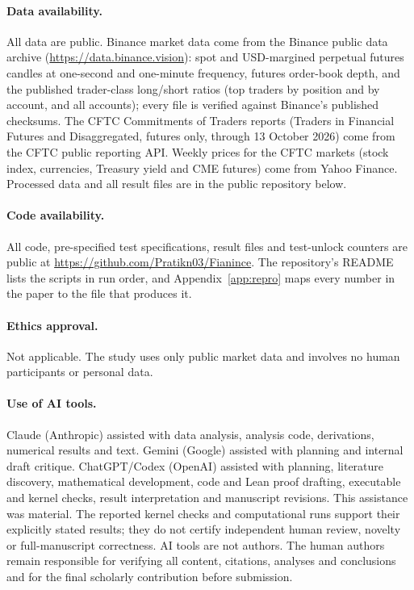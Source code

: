 \documentclass[12pt]{article}
\theoremstyle{definition}
\theoremstyle{remark}
\begin{document}
\paragraph{Data availability.} All data are public. Binance market data come from the Binance public data archive (\url{https://data.binance.vision}): spot and USD-margined perpetual futures candles at one-second and one-minute frequency, futures order-book depth, and the published trader-class long/short ratios (top traders by position and by account, and all accounts); every file is verified against Binance's published checksums. The CFTC Commitments of Traders reports (Traders in Financial Futures and Disaggregated, futures only, through 13 October 2026) come from the CFTC public reporting API. Weekly prices for the CFTC markets (stock index, currencies, Treasury yield and CME futures) come from Yahoo Finance. Processed data and all result files are in the public repository below.

\paragraph{Code availability.} All code, pre-specified test specifications, result files and test-unlock counters are public at \url{https://github.com/Pratikn03/Fianince}. The repository's README lists the scripts in run order, and Appendix~\ref{app:repro} maps every number in the paper to the file that produces it.

\paragraph{Ethics approval.} Not applicable. The study uses only public market data and involves no human participants or personal data.

\paragraph{Use of AI tools.} Claude (Anthropic) assisted with data analysis, analysis code, derivations, numerical results and text. Gemini (Google) assisted with planning and internal draft critique. ChatGPT/Codex (OpenAI) assisted with planning, literature discovery, mathematical development, code and Lean proof drafting, executable and kernel checks, result interpretation and manuscript revisions. This assistance was material. The reported kernel checks and computational runs support their explicitly stated results; they do not certify independent human review, novelty or full-manuscript correctness. AI tools are not authors. The human authors remain responsible for verifying all content, citations, analyses and conclusions and for the final scholarly contribution before submission.
\end{document}
